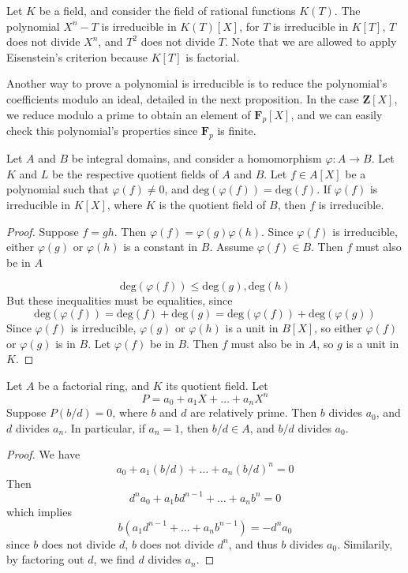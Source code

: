 \begin{example}
    Let $K$ be a field, and consider the field of rational functions $K(T)$. The polynomial $X^n - T$ is irreducible in $K(T)[X]$, for $T$ is irreducible in $K[T]$, $T$ does not divide $X^n$, and $T^2$ does not divide $T$. Note that we are allowed to apply Eisenstein's criterion because $K[T]$ is factorial.
\end{example}

Another way to prove a polynomial is irreducible is to reduce the polynomial's coefficients modulo an ideal, detailed in the next proposition. In the case $\mathbf{Z}[X]$, we reduce modulo a prime to obtain an element of $\mathbf{F}_p[X]$, and we can easily check this polynomial's properties since $\mathbf{F}_p$ is finite.

\begin{theorem}
    Let $A$ and $B$ be integral domains, and consider a homomorphism $\varphi:A \to B$. Let $K$ and $L$ be the respective quotient fields of $A$ and $B$. Let $f \in A[X]$ be a polynomial such that $\varphi(f) \neq 0$, and $\text{deg}(\varphi(f)) = \text{deg}(f)$. If $\varphi(f)$ is irreducible in $K[X]$, where $K$ is the quotient field of $B$, then $f$ is irreducible.
\end{theorem}
\begin{proof}
    Suppose $f = gh$. Then $\varphi(f) = \varphi(g) \varphi(h)$. Since $\varphi(f)$ is irreducible, either $\varphi(g)$ or $\varphi(h)$ is a constant in $B$. Assume $\varphi(f) \in B$. Then $f$ must also be in $A$

    \[ \text{deg}(\varphi(f)) \leq \text{deg}(g), \text{deg}(h) \]
    But these inequalities must be equalities, since
    \[ \text{deg}(\varphi(f)) = \text{deg}(f) + \text{deg}(g) = \text{deg}(\varphi(f)) + \text{deg}(\varphi(g)) \]
    Since $\varphi(f)$ is irreducible, $\varphi(g)$ or $\varphi(h)$ is a unit in $B[X]$, so either $\varphi(f)$ or $\varphi(g)$ is in $B$. Let $\varphi(f)$ be in $B$. Then $f$ must also be in $A$, so $g$ is a unit in $K$.
\end{proof}

\begin{theorem}
    Let $A$ be a factorial ring, and $K$ its quotient field. Let
    \[ P = a_0 + a_1 X + \dots + a_n X^n \]
    Suppose $P(b/d) = 0$, where $b$ and $d$ are relatively prime. Then $b$ divides $a_0$, and $d$ divides $a_n$. In particular, if $a_n = 1$, then $b/d \in A$, and $b/d$ divides $a_0$.
\end{theorem}
\begin{proof}
    We have
    \[ a_0 + a_1 (b/d) + \dots + a_n (b/d)^n = 0 \]
    Then
    \[ d^n a_0 + a_1 b d^{n-1} + \dots + a_n b^n = 0 \]
    which implies
    \[ b(a_1 d^{n-1} + \dots + a_n b^{n-1}) = -d^n a_0 \]
    since $b$ does not divide $d$, $b$ does not divide $d^n$, and thus $b$ divides $a_0$. Similarily, by factoring out $d$, we find $d$ divides $a_n$.
\end{proof}




